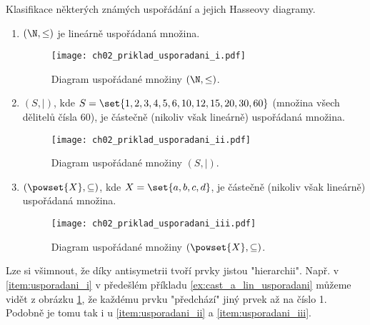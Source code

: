 \begin{example}\label{ex:cast_a_lin_usporadani}
    Klasifikace některých známých uspořádání a jejich Hasseovy diagramy.
    \begin{enumerate}[label=(\roman*)]
        \item\label{item:usporadani_i} $(\N,\leq)$ je lineárně uspořádaná množina.
        \begin{figure}[H]
            \centering
            \texttt{[image: ch02\_priklad\_usporadani\_i.pdf]}
            \caption{Diagram uspořádané množiny $(\N,\leq)$.}
            \label{fig:priklad_usporadani_i}
        \end{figure}
        \item\label{item:usporadani_ii} $(S,\mid)$, kde $S=\set{1, 2, 3, 4, 5, 6, 10, 12, 15, 20, 30, 60}$ (množina všech dělitelů čísla 60), je částečně (nikoliv však lineárně) uspořádaná množina.
        \begin{figure}[H]
            \centering
            \texttt{[image: ch02\_priklad\_usporadani\_ii.pdf]}
            \caption{Diagram uspořádané množiny $(S,\mid)$.}
            \label{fig:priklad_usporadani_ii}
        \end{figure}
        \item\label{item:usporadani_iii} $(\powset{X}, \subseteq)$, kde $X=\set{a,b,c,d}$, je částečně (nikoliv však lineárně) uspořádaná množina.
        \begin{figure}[H]
            \centering
            \texttt{[image: ch02\_priklad\_usporadani\_iii.pdf]}
            \caption{Diagram uspořádané množiny $(\powset{X}, \subseteq)$.}
            \label{fig:priklad_usporadani_iii}
        \end{figure}
    \end{enumerate}
\end{example}
Lze si všimnout, že díky antisymetrii tvoří prvky jistou "hierarchii". Např. v \ref{item:usporadani_i} v předešlém příkladu \ref{ex:cast_a_lin_usporadani} můžeme vidět z obrázku \ref{fig:priklad_usporadani_i}, že každému prvku "předchází" jiný prvek až na číslo 1. Podobně je tomu tak i u \ref{item:usporadani_ii} a \ref{item:usporadani_iii}. %
